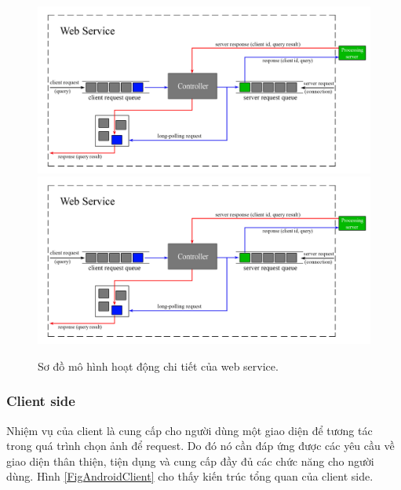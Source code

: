 {\begin{figure}[!htbp]
  \begin{center}
    \leavevmode
    \ifpdf
      \includegraphics[scale=0.17]{ws_model}
    \else
      \includegraphics[scale=0.17]{ws_model}
    \fi
    \caption[Sơ đồ mô hình hoạt động chi tiết của web service]{Sơ đồ mô hình hoạt động chi tiết của web service.}
    \label{FigWS}
  \end{center}
\end{figure}


\subsubsection{Client side}
Nhiệm vụ của client là cung cấp cho người dùng một giao diện để tương tác trong quá trình chọn ảnh để request. Do đó nó cần đáp ứng được các yêu cầu về giao diện thân thiện, tiện dụng và cung cấp đầy đủ các chức năng cho người dùng. Hình \ref{FigAndroidClient} cho thấy kiến trúc tổng quan của client side.

}
